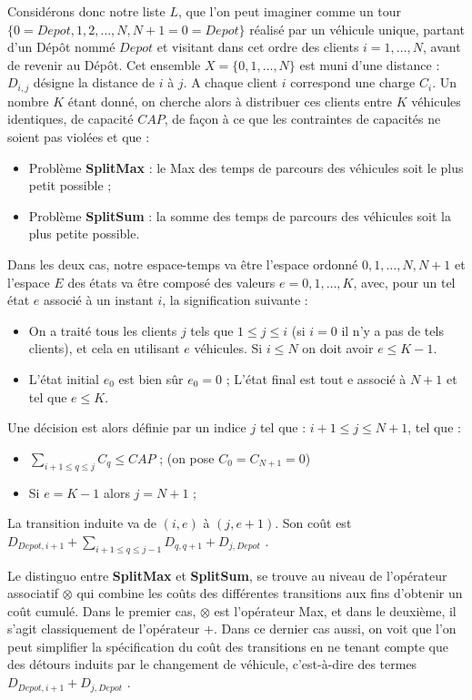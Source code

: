 Considérons donc notre liste $L$, que l'on peut imaginer comme un tour $\{0 = Depot, 1, 2, \dots, N, N+1 = 0 = Depot\}$ réalisé par un véhicule unique, partant d'un Dépôt nommé $Depot$ et visitant dans cet ordre des clients $i = 1, \dots, N$, avant de revenir au Dépôt. Cet ensemble $X = \{0, 1, \dots, N\}$ est muni d'une distance : $D_{i,j}$ désigne la distance de $i$ à $j$. A chaque client $i$ correspond une charge $C_i$. Un nombre $K$ étant donné, on cherche alors à distribuer ces clients entre $K$ véhicules identiques, de capacité $CAP$, de façon à ce que les contraintes de capacités ne soient pas violées et que :
\begin{itemize}[label=$\square$]
	\item	Problème \textbf{SplitMax} : le Max des temps de parcours des véhicules soit le plus petit possible ;
	\item	Problème \textbf{SplitSum} : la somme des temps de parcours des véhicules soit la plus petite possible.
\end{itemize}	
	Dans les deux cas, notre espace-temps va être l'espace ordonné ${0, 1, \dots, N, N+1}$ et l'espace $E$ des états va être composé des valeurs $e = 0, 1, \dots, K$, avec, pour un tel état $e$ associé à un instant $i$,  la signification suivante :
\begin{itemize}[label=$\square$]
	\item	On a traité tous les clients $j$ tels que $1 \leq j \leq i$ (si $i = 0$ il n'y a pas de tels clients), et cela en utilisant $e$ véhicules. Si $i \leq N$ on doit avoir $e \leq K-1$.
	\item	L'état initial $e_0$ est bien sûr $e_0 = 0$ ; L'état final est tout e associé à $N+1$ et tel que $e \leq K$.
\end{itemize}
	Une décision est alors définie par un indice $j$ tel que : $i+1 \leq j \leq N+1$, tel que : 
	\begin{itemize}[label=$\square$]
		\item	$\sum_{i+1 \leq q \leq j} C_q \leq CAP$ ; (on pose $C_0 = C_{N+1} = 0$)
		\item	Si $e = K-1$ alors $j = N+1$ ;
	\end{itemize}
	La transition induite va de $(i, e)$ à $(j, e+1)$. Son coût est $D_{Depot,i+1} + \sum_{i+1 \leq q \leq j-1} D_{q,q+1} + D_{j,Depot}$ .
	
	Le distinguo entre \textbf{SplitMax} et \textbf{SplitSum}, se trouve au niveau de l'opérateur associatif $\otimes$ qui combine les coûts des différentes transitions aux fins d'obtenir un coût cumulé. Dans le premier cas, $\otimes$ est l'opérateur Max, et dans le deuxième, il s'agit classiquement de l'opérateur $+$. Dans ce dernier cas aussi, on voit que l'on peut simplifier la spécification du coût des transitions en ne tenant compte que des détours induits par le changement de véhicule, c'est-à-dire des termes$D_{Depot,i+1} + D_{j,Depot}$ .



